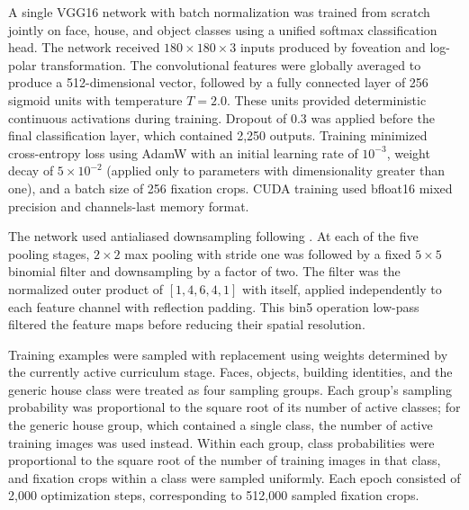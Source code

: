 
A single VGG16 network with batch normalization was trained from scratch jointly on face, house, and object classes using a unified softmax classification head. The network received $180\times180\times3$ inputs produced by foveation and log-polar transformation. The convolutional features were globally averaged to produce a 512-dimensional vector, followed by a fully connected layer of 256 sigmoid units with temperature $T=2.0$. These units provided deterministic continuous activations during training. Dropout of 0.3 was applied before the final classification layer, which contained 2,250 outputs. Training minimized cross-entropy loss using AdamW with an initial learning rate of $10^{-3}$, weight decay of $5\times10^{-2}$ (applied only to parameters with dimensionality greater than one), and a batch size of 256 fixation crops. CUDA training used bfloat16 mixed precision and channels-last memory format.

The network used antialiased downsampling following \cite{zhang2019making}. At each of the five pooling stages, $2\times2$ max pooling with stride one was followed by a fixed $5\times5$ binomial filter and downsampling by a factor of two. The filter was the normalized outer product of $[1,4,6,4,1]$ with itself, applied independently to each feature channel with reflection padding. This bin5 operation low-pass filtered the feature maps before reducing their spatial resolution.

Training examples were sampled with replacement using weights determined by the currently active curriculum stage. Faces, objects, building identities, and the generic house class were treated as four sampling groups. Each group's sampling probability was proportional to the square root of its number of active classes; for the generic house group, which contained a single class, the number of active training images was used instead. Within each group, class probabilities were proportional to the square root of the number of training images in that class, and fixation crops within a class were sampled uniformly. Each epoch consisted of 2,000 optimization steps, corresponding to 512,000 sampled fixation crops.

